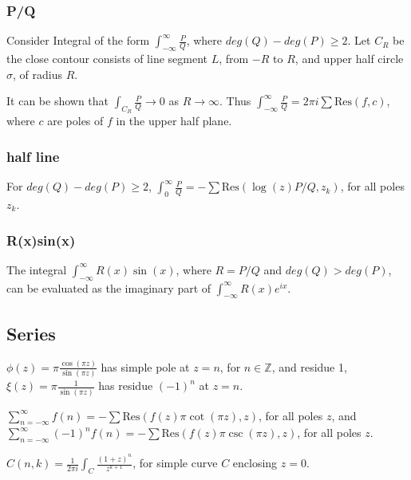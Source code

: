 \documentclass[12pt, a4paper]{article}
\theoremstyle{definition}
\theoremstyle{remark}
\newcommand{\bb}[1]{\mathbb{#1}}
\newcommand{\res}{\text{Res}}
\begin{document}
\subsubsection{P/Q}

Consider Integral of the form $\int_{- \infty}^{\infty}\frac{P}{Q}$, where $deg(Q) - deg(P) \geq 2$. Let $C_R$ be the close contour consists of line segment $L$, from $-R$ to $R$, and upper half circle$\sigma$, of radius $R$. 

It can be shown that $\int_{C_R} \frac{P}{Q} \rightarrow 0$ as $R \rightarrow \infty$. Thus  $\int_{-\infty}^{\infty} \frac{P}{Q} = 2\pi i \sum \res(f, c)$, where $c$ are poles of $f$ in the upper half plane.

\subsubsection{half line}
For $deg(Q) - deg(P) \geq 2$, $\int_{0}^{\infty}\frac{P}{Q} = - \sum \res(\log(z)P/Q, z_k )$, for all poles $z_k$.

\subsubsection{R(x)sin(x)}

The integral $\int_{-\infty}^{\infty} R(x) \sin(x)$, where $R = P/Q$ and $deg(Q)> deg(P)$, can be evaluated as the imaginary part of $\int_{-\infty}^{\infty} R(x) e^{ix}$.

\subsection{Series}

$\phi(z) = \pi \frac{\cos(\pi z)}{\sin(\pi z)}$ has simple pole at $z = n$, for $n \in \bb{Z}$, and residue 1, $\xi(z) = \pi \frac{1}{\sin(\pi z)}$ has residue $(-1)^n$ at $z = n$.

$\sum_{n=-\infty}^{\infty} f(n) = - \sum \res(f(z)\pi \cot(\pi z), z)$, for all poles $z$,
and $\sum_{n=-\infty}^{\infty} (-1)^n f(n) = - \sum \res(f(z)\pi \csc(\pi z), z)$, for all poles $z$.

$C(n,k) = \frac{1}{2\pi i } \int_{C} \frac{(1+z)^n}{z^{k+1}}$, for simple curve $C$ enclosing $z = 0$.

\end{document}
